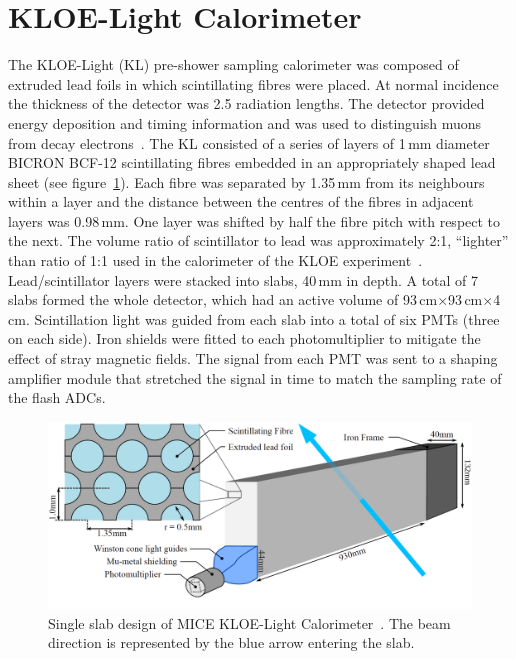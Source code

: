 \graphicspath{ {04-KL/Figures/} }

\section{KLOE-Light Calorimeter}
\label{Sect:KL}

The KLOE-Light (KL) pre-shower sampling calorimeter was composed of
extruded lead foils in which scintillating fibres were placed.
At normal incidence the thickness of the detector was 2.5 radiation
lengths.
The detector provided energy deposition and timing information and was
used to distinguish muons from decay
electrons~\cite{2016JInst..11P3001A}.
The KL consisted of a series of layers of 1\,mm diameter BICRON BCF-12
scintillating fibres embedded in an appropriately shaped lead sheet
(see figure~\ref{fig:KL2}).
Each fibre was separated by 1.35\,mm from its neighbours within a
layer and the distance between the centres of the fibres in adjacent
layers was 0.98\,mm.
One layer was shifted by half the fibre pitch with respect to the next.
The volume ratio of scintillator to lead was approximately 2:1,
``lighter'' than ratio of 1:1 used in the calorimeter of the KLOE
experiment~\cite{Ambrosino:2009zza}. 
Lead/scintillator layers were stacked into slabs, 40\,mm in depth.
A total of 7 slabs formed the whole detector, which had an active
volume of 93\,cm$\times$93\,cm$\times$4\,cm.
Scintillation light was guided from each slab into a total of six PMTs
(three on each side).
Iron shields were fitted to each photomultiplier to mitigate the effect of stray magnetic fields.
The signal from each PMT was sent to a shaping amplifier module
that stretched the signal in time to match the sampling rate
of the flash ADCs. \\
\begin{figure}
  \begin{center}
    \includegraphics[width=0.8\columnwidth]{./04-KL/Figures/KL2_with_beam.png}
    \caption{Single slab design of MICE KLOE-Light Calorimeter~\cite{Overton:2014tka}.
    The beam direction is represented by the blue arrow entering the slab.
    }
    \label{fig:KL2}
  \end{center}
\end{figure}

